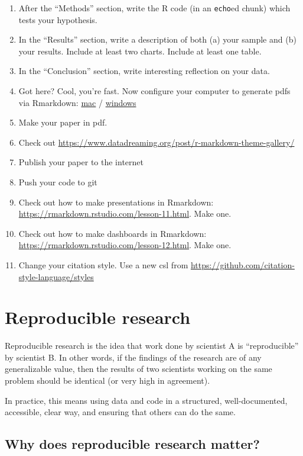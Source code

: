 \documentclass[
]{book}
\begin{document}
\begin{enumerate}
\item
  After the ``Methods'' section, write the R code (in an \texttt{echo}ed chunk) which tests your hypothesis.
\item
  In the ``Results'' section, write a description of both (a) your sample and (b) your results. Include at least two charts. Include at least one table.
\item
  In the ``Conclusion'' section, write interesting reflection on your data.
\item
  Got here? Cool, you're fast. Now configure your computer to generate pdfs via Rmarkdown: \href{https://medium.com/@sorenlind/create-pdf-reports-using-r-r-markdown-latex-and-knitr-on-macos-high-sierra-e7b5705c9fd}{mac} / \href{https://medium.com/@sorenlind/create-pdf-reports-using-r-r-markdown-latex-and-knitr-on-windows-10-952b0c48bfa9}{windows}
\item
  Make your paper in pdf.
\item
  Check out \url{https://www.datadreaming.org/post/r-markdown-theme-gallery/}
\item
  Publish your paper to the internet
\item
  Push your code to git
\item
  Check out how to make presentations in Rmarkdown: \url{https://rmarkdown.rstudio.com/lesson-11.html}. Make one.
\item
  Check out how to make dashboards in Rmarkdown: \url{https://rmarkdown.rstudio.com/lesson-12.html}. Make one.
\item
  Change your citation style. Use a new csl from \url{https://github.com/citation-style-language/styles}
\end{enumerate}

\hypertarget{rr}{%
\chapter{Reproducible research}\label{rr}}

Reproducible research is the idea that work done by scientist A is ``reproducible'' by scientist B. In other words, if the findings of the research are of any generalizable value, then the results of two scientists working on the same problem should be identical (or very high in agreement).

In practice, this means using data and code in a structured, well-documented, accessible, clear way, and ensuring that others can do the same.

\hypertarget{why-does-reproducible-research-matter}{%
\section*{Why does reproducible research matter?}\label{why-does-reproducible-research-matter}}
\end{document}
